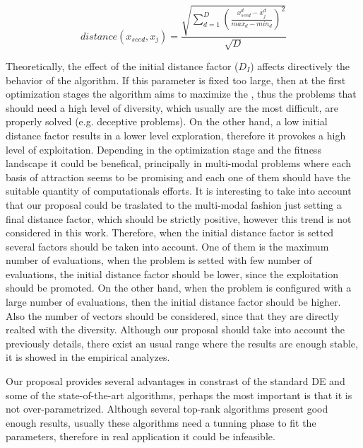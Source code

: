 \begin{equation}\label{eqn:distance}
distance ( x_{seed}, x_j ) = \frac{\sqrt{ \sum_{d=1}^D \left ( \frac{x_{seed}^d - x_j^d}{max_d - min_d} \right )^2  }} {\sqrt{D}}
\end{equation}


%
Theoretically, the effect of the initial distance factor ($D_I$) affects directively the behavior of the algorithm.
%
If this parameter is fixed too large, then at the first optimization stages the algorithm aims to maximize the \DCN{}, thus the problems that should need a high level of diversity, which usually are the most difficult, are properly solved (e.g. deceptive problems).
%
On the other hand, a low initial distance factor results in a lower level exploration, therefore it provokes a high level of exploitation.
%
Depending in the optimization stage and the fitness landscape it could be benefical, principally in multi-modal problems where each basis of attraction seems to be promising and each one of them should have the suitable quantity of computationals efforts.
%
It is interesting to take into account that our proposal could be traslated to the multi-modal fashion just setting a final distance factor, which should be strictly positive, however this trend is not considered in this work.
%
Therefore, when the initial distance factor is setted several factors should be taken into account.
%
One of them is the maximum number of evaluations, when the problem is setted with few number of evaluations, the initial distance factor should be lower, since the exploitation should be promoted.
%
On the other hand, when the problem is configured with a large number of evaluations, then the initial distance factor should be higher.
%
Also the number of vectors should be considered, since that they are directly realted with the diversity.
%
Although our proposal should take into account the previously details, there exist an usual range where the results are enough stable, it is showed in the empirical analyzes.
%

Our proposal provides several advantages in constrast of the standard DE and some of the state-of-the-art algorithms, perhaps the most important is that it is not over-parametrized.
%
Although several top-rank algorithms present good enough results, usually these algorithms need a tunning phase to fit the parameters, therefore in real application it could be infeasible.

